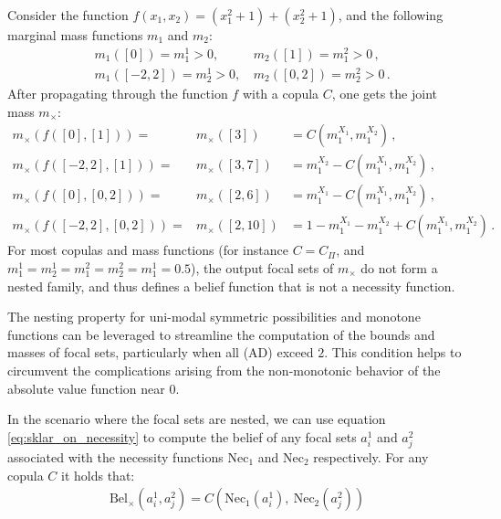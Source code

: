 \begin{example}
    Consider the function $f(x_1,x_2)=(x_1^2+1)+(x_2^2+1)$, and the following marginal mass functions $m_1$ and $m_2$:
\begin{align*}
    &m_{1}([0]) = m^{1}_1>0,\, &m_{2}([1]) = m^{2}_1>0\,,\\
    &m_{1}([-2,2]) = m^{1}_2>0,\, &m_{2}([0,2]) = m^{2}_2>0\,.
\end{align*}
After propagating through the function $f$ with a copula $C$, one gets the joint mass $m_\times$:
\begin{eqnarray*}
    m_\times(f([0],[1])) =& m_\times([3]) &= C(m^{X_1}_1,m^{X_2}_1)\,,\\
    m_\times(f([-2,2],[1])) =& m_\times([3,7]) &= m^{X_2}_1 - C(m^{X_1}_1,m^{X_2}_1)\,,\\
    m_\times(f([0],[0,2])) =& m_\times([2,6]) &= m^{X_1}_1 - C(m^{X_1}_1,m^{X_2}_1)\,,\\
    m_\times(f([-2,2],[0,2])) =& m_\times([2,10]) &= 1 - m^{X_1}_1 - m^{X_2}_1 + C(m^{X_1}_1,m^{X_2}_1)\,.
\end{eqnarray*}
For most copulas and mass functions (for instance $C=C_\Pi$, and $m^1_1=m^1_2=m^2_1=m^2_2=m^1_1=0.5$), the output focal sets of $m_\times$ do not form a nested family, and thus defines a belief function that is not a necessity function.
\end{example}

The nesting property for uni-modal symmetric possibilities and monotone functions can be leveraged to streamline the computation of the bounds and masses of focal sets, particularly when all (AD) exceed $2$. This condition helps to circumvent the complications arising from the non-monotonic behavior of the absolute value function near $0$.

In the scenario where the focal sets are nested, we can use equation \eqref{eq:sklar_on_necessity} to compute the belief of any focal sets $a^1_i$ and $a^2_j$ associated with the necessity functions $\mathrm{Nec}_1$ and $\mathrm{Nec}_2$ respectively. For any copula $C$ it holds that:
\begin{align*}
    \mathrm{Bel}_\times(a^1_i, a^2_j) = C(\mathrm{Nec}_1(a^1_i),~\mathrm{Nec}_2(a^2_j))
\end{align*}

